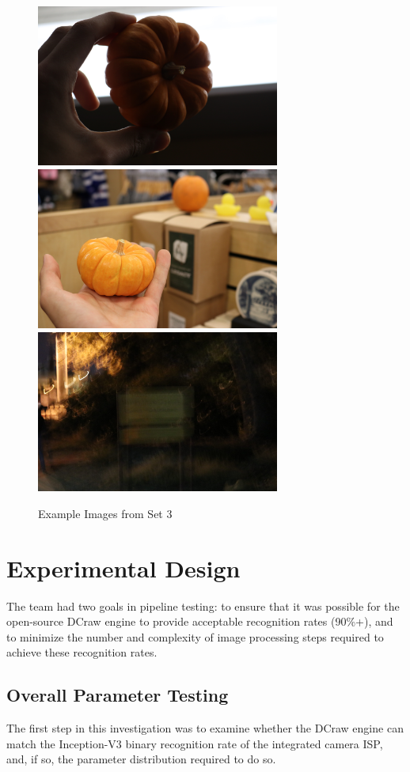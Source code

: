 \documentclass{report}
\begin{document}
	\begin{figure}[h]
		\begin{center}
			\caption{Example Images from Set 3}
			\label{set3}
			\includegraphics[width=8cm]{set3_pumpkin1.JPG}
			\includegraphics[width=8cm]{set3_pumpkin2.JPG}
			\includegraphics[width=8cm]{set3_other.JPG}
		\end{center}
	\end{figure}	
		
	\section{Experimental Design}
		The team had two goals in pipeline testing: to ensure that it was possible for the open-source DCraw engine to provide acceptable recognition rates (90\%+), and to minimize the number and complexity of image processing steps required to achieve these recognition rates.
		\subsection{Overall Parameter Testing}
		The first step in this investigation was to examine whether the DCraw engine can match the Inception-V3 binary recognition rate of the integrated camera ISP, and, if so, the parameter distribution required to do so.
		
\end{document}
